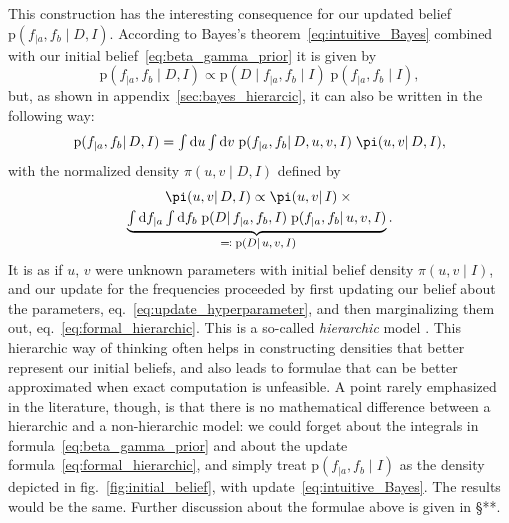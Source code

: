 \documentclass[\ifafour a4paper,12pt,\else a5paper,10pt,\fi%
onecolumn,oneside,article,%
british%
]{memoir}
\theoremstyle{remark}
\theoremstyle{innote}
\newcommand*{\citep}{\parencites}
\newcommand*{\di}{\mathrm{d}}%
\newcommand*{\defs}{\eqqcolon}
\newcommand*{\pf}{\mathrm{p}}%
\renewcommand*{\|}{\mathpunct{|}}
\newcommand*{\sect}{\S}%
\newcommand*{\eqn}{eq.}%
\newcommand*{\fig}{fig.}%
\newcommand*{\zerob}[1]{\makebox[0pt][c]{#1}}
\newcommand*{\tint}{\begingroup\textstyle\int\endgroup\nolimits}
\newcommand*{\yD}{D}
\newcommand*{\yI}{I}
\newcommand*{\ya}{a}
\newcommand*{\yb}{b}
\newcommand*{\dbeta}{\betaup}
\newcommand*{\dA}{\pi}
\newcommand*{\yua}{u}
\newcommand*{\yub}{v}
\begin{document}
This construction has the interesting consequence for our updated belief
$\pf(f_{|\ya}, f_{\yb} \| \yD, \yI)$. According to Bayes's
theorem~\eqref{eq:intuitive_Bayes} combined with our initial
belief~\eqref{eq:beta_gamma_prior} it is given by
\begin{equation}
  \label{eq:straight_Bayes}
  \pf(f_{|\ya}, f_{\yb} \| \yD, \yI)
  \propto
  \pf(\yD \| f_{|\ya}, f_{\yb} \| \yI)\;
  \pf(f_{|\ya}, f_{\yb} \| \yI),
\end{equation}
but, as shown in appendix~\ref{sec:bayes_hierarcic}, it can also be written
in the following way:
\begin{equation}
  \label{eq:formal_hierarchic}
  \pf(f_{|\ya}, f_{\yb} \| \yD, \yI) =
  \tint\di\yua\tint\di\yub\;
  \pf(f_{|\ya}, f_{\yb}\| \yD,\yua,\yub,\yI)\;
  \dA(\yua,\yub \|\yD, \yI),
\end{equation}
with the normalized density $\dA(\yua,\yub \|\yD, \yI)$ defined by
\begin{multline}
  \label{eq:update_hyperparameter}
  \dA(\yua,\yub \|\yD, \yI) \propto   \dA(\yua,\yub \|\yI)
\times{}\\
\underbrace{\tint\di f_{|\ya}\tint\di f_{\yb}\;
  \pf(\yD \|f_{|\ya}, f_{\yb}, \yI)\;
 \pf(f_{|\ya}, f_{\yb} \|\yua,\yub, \yI)}_{\zerob{\footnotesize${}\defs\pf(\yD \|\yua,\yub,\yI)$}}.
\end{multline}
It is as if $\yua$, $\yub$ were unknown parameters with initial belief
density $\dA(\yua,\yub \|\yI)$, and our update for the frequencies proceeded by
first updating our belief about the parameters,
\eqn~\eqref{eq:update_hyperparameter}, and then marginalizing them out,
\eqn~\eqref{eq:formal_hierarchic}. This is a so-called \emph{hierarchic}
model \citep{good1980}. This hierarchic way of thinking often helps in
constructing densities that better represent our initial beliefs, and also
leads to formulae that can be better approximated when exact computation is
unfeasible. A point rarely emphasized in the literature, though, is that
there is no mathematical difference between a hierarchic and a
non-hierarchic model: we could forget about the integrals in
formula~\eqref{eq:beta_gamma_prior} and about the update
formula~\eqref{eq:formal_hierarchic}, and simply treat
$\pf(f_{|\ya}, f_{\yb} \| \yI)$ as the density depicted in
\fig~\ref{fig:initial_belief}, with update~\eqref{eq:intuitive_Bayes}. The
results would be the same. Further discussion about the formulae above is
given in \sect***.
\end{document}
